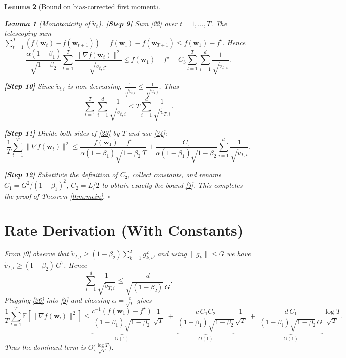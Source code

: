 \documentclass{article}
\newtheorem{lemma}{Lemma}
\newcommand{\E}{\mathbb{E}}
\begin{document}
\begin{lemma}[Bound on bias‑corrected first moment]
\begin{lemma}[Monotonicity of $\tilde{\bm v}_{t}$]
\noindent\textbf{[Step 9]} Sum \eqref{22} over $t=1,\dots,T$.
The telescoping sum $\sum_{t=1}^{T}(f(\bm{w}_{t})-f(\bm{w}_{t+1}))
= f(\bm{w}_{1})-f(\bm{w}_{T+1})\le f(\bm{w}_{1})-f^{\star}$.
Hence
\[
\frac{\alpha(1-\beta_{1})}{\sqrt{1-\beta_{2}}}
\sum_{t=1}^{T}
\frac{\|\nabla f(\bm{w}_{t})\|^{2}}{\sqrt{\tilde v_{t,i^{\star}}}}
\le
f(\bm{w}_{1})-f^{\star}
+C_{3}\sum_{t=1}^{T}\sum_{i=1}^{d}\frac{1}{\sqrt{\tilde v_{t,i}}}.
\tag{23}
\]

\noindent\textbf{[Step 10]} Since $\tilde v_{t,i}$ is non‑decreasing,
$\frac{1}{\sqrt{\tilde v_{t,i}}}\le\frac{1}{\sqrt{\tilde v_{T,i}}}$.
Thus
\[
\sum_{t=1}^{T}\sum_{i=1}^{d}\frac{1}{\sqrt{\tilde v_{t,i}}}
\le
T\sum_{i=1}^{d}\frac{1}{\sqrt{\tilde v_{T,i}}}.
\tag{24}
\]

\noindent\textbf{[Step 11]} Divide both sides of \eqref{23} by
$T$ and use \eqref{24}:
\[
\frac{1}{T}\sum_{t=1}^{T}\|\nabla f(\bm{w}_{t})\|^{2}
\le
\frac{f(\bm{w}_{1})-f^{\star}}{\alpha(1-\beta_{1})\sqrt{1-\beta_{2}}\,T}
+\frac{C_{3}}{\alpha(1-\beta_{1})\sqrt{1-\beta_{2}}}
\sum_{i=1}^{d}\frac{1}{\sqrt{\tilde v_{T,i}}}.
\tag{25}
\]

\noindent\textbf{[Step 12]} Substitute the definition of $C_{3}$,
collect constants, and rename
$C_{1}=G^{2}/(1-\beta_{1})^{2}$, $C_{2}=L/2$ to obtain exactly the bound
\eqref{9}. This completes the proof of Theorem \ref{thm:main}.
\hfill $\square$

\section*{Rate Derivation (With Constants)}
From \eqref{9} observe that $\tilde v_{T,i}\ge (1-\beta_{2})\sum_{k=1}^{T}
g_{k,i}^{2}$, and using $\|g_{k}\|\le G$ we have
$\tilde v_{T,i}\ge (1-\beta_{2})\,G^{2}$. Hence
\[
\sum_{i=1}^{d}\frac{1}{\sqrt{\tilde v_{T,i}}}
\le
\frac{d}{\sqrt{(1-\beta_{2})}\,G}.
\tag{26}
\]
Plugging \eqref{26} into \eqref{9} and choosing $\alpha=\frac{c}{\sqrt{T}}$
gives
\[
\frac{1}{T}\sum_{t=1}^{T}\E\!\left[\|\nabla f(\bm{w}_{t})\|^{2}\right]
\le
\underbrace{\frac{c^{-1}(f(\bm{w}_{1})-f^{\star})}{(1-\beta_{1})\sqrt{1-\beta_{2}}}}_{O(1)}
\frac{1}{\sqrt{T}}
\;+\;
\underbrace{\frac{c\,C_{1}C_{2}}{(1-\beta_{1})\sqrt{1-\beta_{2}}}}_{O(1)}
\frac{1}{\sqrt{T}}
\;+\;
\underbrace{\frac{d\,C_{1}}{(1-\beta_{1})\sqrt{1-\beta_{2}}\,G}}_{O(1)}
\frac{\log T}{\sqrt{T}}.
\]
Thus the dominant term is $O\bigl(\frac{\log T}{\sqrt{T}}\bigr)$.


\end{lemma}
\end{lemma}
\end{document}
